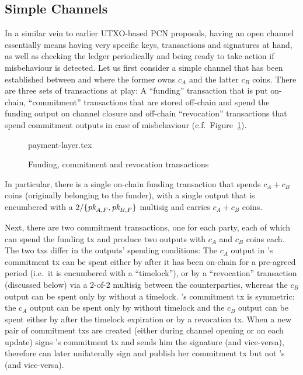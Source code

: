 \subsection{Simple Channels}
  In a similar vein to earlier UTXO-based PCN proposals, having an open channel essentially
  means having very specific keys, transactions and signatures at hand, as well
  as checking the ledger periodically and being ready to take action if
  misbehaviour is detected. Let us first consider a simple channel that has been
  established between \alice and \bob where the former owns $c_A$ and the latter
  $c_B$ coins. There are three sets of transactions at play: A ``funding''
  transaction that is put on-chain, ``commitment'' transactions that are stored
  off-chain and
  spend the funding output on channel closure and off-chain ``revocation''
  transactions that spend commitment outputs in case of misbehaviour (c.f.\
  Figure~\ref{figure:payment-layer}).

  \begin{figure}
    \centering
    {payment-layer.tex}
    \caption{Funding, commitment and revocation transactions}
    \label{figure:payment-layer}
  \end{figure}

  In particular, there is a single on-chain funding transaction that spends $c_A
  + c_B$ coins (originally belonging to the funder), with a single output that is encumbered with a
  $2/\{\textit{pk}_{A, F}, \textit{pk}_{B, F}\}$ multisig and carries $c_A + c_B$ coins.

  Next, there are two commitment transactions, one for each party, each of which can spend the
  funding tx and produce two outputs with $c_A$ and $c_B$ coins each. The two
  txs differ in the outputs' spending conditions: The $c_A$ output in \alice's
  commitment tx can be spent either by \alice after it has been on-chain for a
  pre-agreed period (i.e.\ it is encumbered with a ``timelock''), or by a
  ``revocation'' transaction (discussed below) via a $2$-of-$2$ multisig between
  the counterparties, whereas the $c_B$ output can be spent only by \bob without
  a timelock. \bob's commitment tx is symmetric: the $c_A$ output can be spent
  only by \alice without timelock and the $c_B$ output can be spent either by
  \bob after the timelock expiration or by a revocation tx. When a new pair of
  commitment txs are created (either during channel opening or on each update)
  \alice signs \bob's commitment tx and sends him the signature (and
  vice-versa), therefore \alice can later unilaterally sign and publish her commitment
  tx but not \bob's (and vice-versa).

